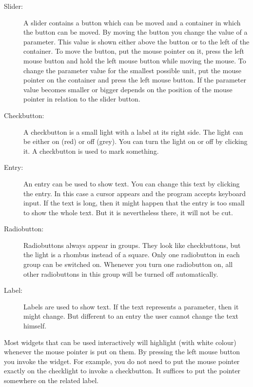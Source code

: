 \documentclass[a4paper]{article}
\begin{document}
\begin{description}
\item[Slider:] A slider contains a button which can be moved and a container
in which the button can be moved. By moving the
button you change the value of a parameter. This value is shown either above
the button or to the left of the container. To move the button, put the mouse
pointer on it, press the left mouse button and hold the left mouse button
while moving the mouse. To change the parameter value for the smallest
possible unit, put the mouse pointer on the container and press the left
mouse button. If the parameter value becomes smaller or bigger depends on the
position of the mouse pointer in relation to the slider button.
\item[Checkbutton:] A checkbutton is a small light with a label at its right
side. The light can be either on (red) or off (grey). You can turn the light
on or off by clicking it. A checkbutton is used to mark something.
\item[Entry:] An entry can be used to show text. You can change this text
by clicking the entry. In this case a cursor appears and the program accepts
keyboard input. If the text is long, then it might happen that the entry is too
small to show the whole text. But it is nevertheless there, it will not be cut.
\item[Radiobutton:] Radiobuttons always appear in groups. They look like
checkbuttons, but the light is a rhombus instead of a square. Only one
radiobutton in each group can be switched on. Whenever you turn one radiobutton
on, all other radiobuttons in this group will be turned off automatically.
\item[Label:] Labels are used to show text. If the text represents a parameter,
then it might change. But different to an entry the user cannot change the 
text himself.
\end{description}
Most widgets that can be used interactively will highlight (with white colour)
whenever the mouse pointer is put on them. By pressing the left mouse button
you invoke the widget. For example, you do not need to put the mouse pointer
exactly on the checklight to invoke a checkbutton. It suffices to put the
pointer somewhere on the related label.

\vspace{3mm}
\end{document}
